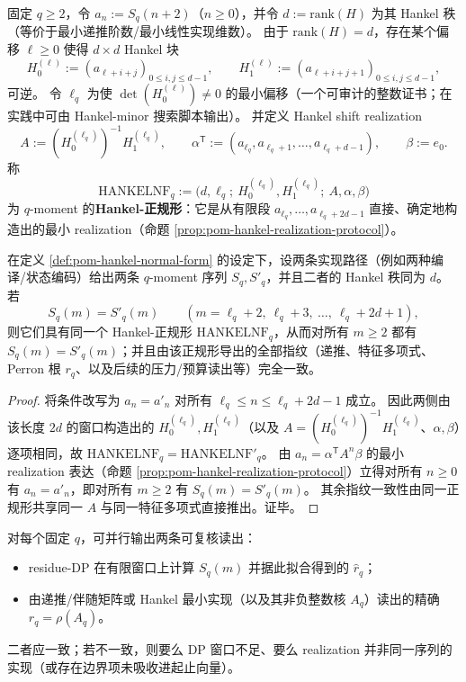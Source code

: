 \begin{definition}\label{def:pom-hankel-normal-form}
固定 \(q\ge 2\)，令 \(a_n:=S_q(n+2)\)（\(n\ge 0\)），并令 \(d:=\mathrm{rank}(H)\) 为其 Hankel 秩（等价于最小递推阶数/最小线性实现维数）。
由于 \(\mathrm{rank}(H)=d\)，存在某个偏移 \(\ell\ge 0\) 使得 \(d\times d\) Hankel 块
\[
H_0^{(\ell)}:=(a_{\ell+i+j})_{0\le i,j\le d-1},
\qquad
H_1^{(\ell)}:=(a_{\ell+i+j+1})_{0\le i,j\le d-1},
\]
可逆。
令 \(\ell_q\) 为使 \(\det(H_0^{(\ell)})\neq 0\) 的最小偏移（一个可审计的整数证书；在实践中可由 Hankel-minor 搜索脚本输出）。
并定义 Hankel shift realization
\[
A:=(H_0^{(\ell_q)})^{-1}H_1^{(\ell_q)},
\qquad
\alpha^{\mathsf T}:=(a_{\ell_q},a_{\ell_q+1},\dots,a_{\ell_q+d-1}),
\qquad
\beta:=e_0.
\]
称
\[
\boxed{\;
\mathrm{HANKELNF}_q:=\bigl(d,\ell_q;\ H_0^{(\ell_q)},H_1^{(\ell_q)};\ A,\alpha,\beta\bigr)\;}
\]
为 \(q\)-moment 的\textbf{Hankel-正规形}：它是从有限段 \(a_{\ell_q},\dots,a_{\ell_q+2d-1}\) 直接、确定地构造出的最小 realization（命题 \ref{prop:pom-hankel-realization-protocol}）。
\end{definition}

\begin{proposition}\label{prop:pom-moment-finite-sampling-decidable}
在定义 \ref{def:pom-hankel-normal-form} 的设定下，设两条实现路径（例如两种编译/状态编码）给出两条 \(q\)-moment 序列 \(S_q,S'_q\)，并且二者的 Hankel 秩同为 \(d\)。
若
\[
S_q(m)=S'_q(m)\qquad(m=\ell_q+2,\ \ell_q+3,\ \dots,\ \ell_q+2d+1),
\]
则它们具有同一个 Hankel-正规形 \(\mathrm{HANKELNF}_q\)，从而对所有 \(m\ge 2\) 都有 \(S_q(m)=S'_q(m)\)；并且由该正规形导出的全部指纹（递推、特征多项式、Perron 根 \(r_q\)、以及后续的压力/预算读出等）完全一致。
\end{proposition}
\begin{proof}
将条件改写为 \(a_n=a'_n\) 对所有 \(\ell_q\le n\le \ell_q+2d-1\) 成立。
因此两侧由该长度 \(2d\) 的窗口构造出的 \(H_0^{(\ell_q)},H_1^{(\ell_q)}\)（以及 \(A=(H_0^{(\ell_q)})^{-1}H_1^{(\ell_q)}\)、\(\alpha,\beta\)）逐项相同，故 \(\mathrm{HANKELNF}_q=\mathrm{HANKELNF}'_q\)。
由 \(a_n=\alpha^{\mathsf T}A^n\beta\) 的最小 realization 表达（命题 \ref{prop:pom-hankel-realization-protocol}）立得对所有 \(n\ge 0\) 有 \(a_n=a'_n\)，即对所有 \(m\ge 2\) 有 \(S_q(m)=S'_q(m)\)。
其余指纹一致性由同一正规形共享同一 \(A\) 与同一特征多项式直接推出。证毕。
\end{proof}

\begin{remark}\label{rem:pom-dp-vs-realization-audit}
对每个固定 \(q\)，可并行输出两条可复核读出：
\begin{itemize}
  \item residue-DP 在有限窗口上计算 \(S_q(m)\) 并据此拟合得到的 \(\widehat r_q\)；
  \item 由递推/伴随矩阵或 Hankel 最小实现（以及其非负整数核 \(A_q\)）读出的精确 \(r_q=\rho(A_q)\)。
\end{itemize}
二者应一致；若不一致，则要么 DP 窗口不足、要么 realization 并非同一序列的实现（或存在边界项未吸收进起止向量）。
\end{remark}

